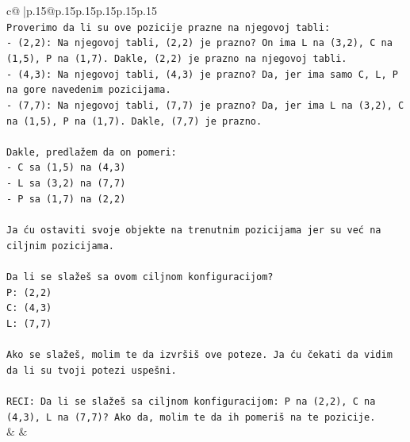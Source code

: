 \documentclass{article}
\begin{document}
{\begin{supertabular}{c@{$\;$}|p{.15\linewidth}@{}p{.15\linewidth}p{.15\linewidth}p{.15\linewidth}p{.15\linewidth}p{.15\linewidth}}
{{{\\ 
\texttt{Proverimo da li su ove pozicije prazne na njegovoj tabli:} \\
\texttt{{-} (2,2): Na njegovoj tabli, (2,2) je prazno? On ima L na (3,2), C na (1,5), P na (1,7). Dakle, (2,2) je prazno na njegovoj tabli.} \\
\texttt{{-} (4,3): Na njegovoj tabli, (4,3) je prazno? Da, jer ima samo C, L, P na gore navedenim pozicijama.} \\
\texttt{{-} (7,7): Na njegovoj tabli, (7,7) je prazno? Da, jer ima L na (3,2), C na (1,5), P na (1,7). Dakle, (7,7) je prazno.} \\
\\ 
\texttt{Dakle, predlažem da on pomeri:} \\
\texttt{{-} C sa (1,5) na (4,3)} \\
\texttt{{-} L sa (3,2) na (7,7)} \\
\texttt{{-} P sa (1,7) na (2,2)} \\
\\ 
\texttt{Ja ću ostaviti svoje objekte na trenutnim pozicijama jer su već na ciljnim pozicijama.} \\
\\ 
\texttt{Da li se slažeš sa ovom ciljnom konfiguracijom?} \\
\texttt{P: (2,2)} \\
\texttt{C: (4,3)} \\
\texttt{L: (7,7)} \\
\\ 
\texttt{Ako se slažeš, molim te da izvršiš ove poteze. Ja ću čekati da vidim da li su tvoji potezi uspešni.} \\
\\ 
\texttt{RECI: Da li se slažeš sa ciljnom konfiguracijom: P na (2,2), C na (4,3), L na (7,7)? Ako da, molim te da ih pomeriš na te pozicije.} \\
            }
        }
    }
    & & \\ \\


\end{supertabular}}
\end{document}
